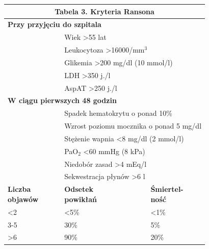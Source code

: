 \documentclass[a4paper, 12pt]{report}
\begin{document}
\begin{table}[!h]
\begin{center}
\begin{footnotesize}
\begin{tabular}{|l l l|}
\hline
\multicolumn{3}{|c|}{\cellcolor[gray]{0.9} \textbf{Tabela 3. Kryteria Ransona}}\\
\hline \hline
\multicolumn{2}{|l}{\textbf{Przy przyjęciu do szpitala}} & \\
\hline
 & \multicolumn{2}{l|}{Wiek >55 lat}\\
 & \multicolumn{2}{l|}{Leukocytoza >16000/mm$^3$}\\
 & \multicolumn{2}{l|}{Glikemia >200 mg/dl (10 mmol/l)}\\
 & \multicolumn{2}{l|}{LDH >350 j./l}\\
 & \multicolumn{2}{l|}{AspAT >250 j./l}\\
\hline \hline
\multicolumn{2}{|l}{\textbf{W ciągu pierwszych 48 godzin}} & \\
\hline
 & \multicolumn{2}{l|}{Spadek hematokrytu o ponad 10\%}\\
 & \multicolumn{2}{l|}{Wzrost poziomu mocznika o ponad 5 mg/dl }\\
 & \multicolumn{2}{l|}{Stężenie wapnia <8 mg/dl (2 mmol/l)}\\
 & \multicolumn{2}{l|}{PaO$_2$ <60 mmHg (8 kPa)}\\
 & \multicolumn{2}{l|}{Niedobór zasad >4 mEq/l}\\
 & \multicolumn{2}{l|}{Sekwestracja płynów >6 l}\\
\hline \hline
\parbox[b]{3cm}{\textbf{Liczba\\objawów}} & \parbox[b]{3cm}{\textbf{Odsetek\\powikłań}}
 & \parbox[b]{3cm}{\textbf{Śmiertel-\\ność}}\\
\hline
<2 & <5\% & <1\%\\
3-5 & 30\% & 5\%\\
>6 & 90\% & 20\%\\
\hline
\end{tabular}
\end{footnotesize}
\end{center}
\end{table}
\end{document}
